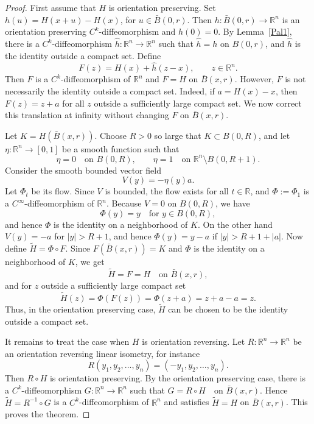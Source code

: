 \documentclass[12pt,leqno]{amsart}
\theoremstyle{definition}
\numberwithin{theorem}{section} \numberwithin{equation}{section}
\begin{document}
\begin{proof}
First assume that $H$ is orientation preserving. Set
$h(u)=H(x+u)-H(x)$, for $u\in \bar B(0,r)$.
Then $h:\bar B(0,r)\to\mathbb R^n$ is an orientation preserving $C^k$-diffeomorphism and $h(0)=0$. By Lemma~\ref{Pal1}, there is a $C^k$-diffeomorphism $\widehat h:\mathbb R^n\to\mathbb R^n$ such that
$\widehat h=h$ on  $B(0,r)$,
and $\widehat h$ is the identity outside a compact set. Define
\[
F(z)=H(x)+\widehat h(z-x), \qquad z\in\mathbb R^n.
\]
Then $F$ is a $C^k$-diffeomorphism of $\mathbb R^n$ and $F=H$ on $\bar B(x,r)$. However, $F$ is not necessarily the identity outside a compact set. Indeed, if
$a=H(x)-x$,
then $F(z)=z+a$ for all $z$ outside a sufficiently large compact set. We now correct this translation at infinity without changing $F$ on $\bar B(x,r)$.

Let $K=H(\bar B(x,r))$. Choose $R>0$ so large that $K\subset B(0,R)$, and let $\eta:\mathbb R^n\to[0,1]$ be a smooth function such that
\[
\eta=0 \quad \text{on } B(0,R),
\qquad
\eta=1 \quad \text{on } \mathbb R^n\setminus B(0,R+1).
\]
Consider the smooth bounded vector field
\[
V(y)=-\eta(y)a.
\]
Let $\Phi_t$ be its flow. Since $V$ is bounded, the flow exists for all $t\in\mathbb R$, and $\Phi:=\Phi_1$ is a $C^\infty$-diffeomorphism of $\mathbb R^n$. Because $V=0$ on $B(0,R)$, we have
\[
\Phi(y)=y \quad \text{for } y\in B(0,R),
\]
and hence $\Phi$ is the identity on a neighborhood of $K$. On the other hand $V(y)=-a$ for $|y|>R+1$, and hence $\Phi(y)=y-a$ if $|y|>R+1+|a|$.
Now define
$\widetilde H=\Phi\circ F$.
Since $F(\bar B(x,r))=K$ and $\Phi$ is the identity on a neighborhood of $K$, we get
\[
\widetilde H=F=H \quad \text{on } \bar B(x,r),
\]
and for $z$ outside a sufficiently large compact set
\[
\widetilde H(z)=\Phi(F(z))=\Phi(z+a)=z+a-a=z.
\]
Thus, in the orientation preserving case, $\widetilde H$ can be chosen to be the identity outside a compact set.

It remains to treat the case when $H$ is orientation reversing. Let $R:\mathbb R^n\to\mathbb R^n$ be an orientation reversing linear isometry, for instance
\[
R(y_1,y_2,\ldots,y_n)=(-y_1,y_2,\ldots,y_n).
\]
Then $R\circ H$ is orientation preserving. By the orientation preserving case, there is a $C^k$-diffeomorphism $G:\mathbb R^n\to\mathbb R^n$ such that
$G=R\circ H \quad \text{on } \bar B(x,r)$.
Hence $\widetilde H=R^{-1}\circ G$ is a $C^k$-diffeomorphism of $\mathbb R^n$ and satisfies $\widetilde H=H$ on $\bar B(x,r)$. This proves the theorem.
\end{proof}
\end{document}
